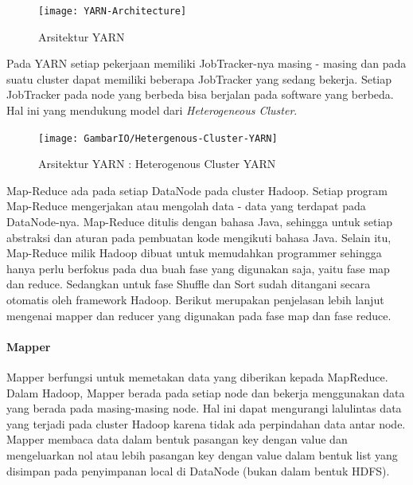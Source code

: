 \begin{figure}[H]
\centering
\texttt{[image: YARN-Architecture]}
\caption[Arsitektur YARN]{Arsitektur YARN}
\label{fig:Arsitektur YARN-1}
\end{figure}
		
Pada YARN setiap pekerjaan memiliki JobTracker-nya masing - masing dan pada suatu cluster dapat memiliki beberapa JobTracker yang sedang bekerja. Setiap JobTracker pada node yang berbeda bisa berjalan pada software yang berbeda. Hal ini yang mendukung model  dari \textit{Heterogeneous Cluster}.


\begin{figure}[h]
	\centering
	\texttt{[image: GambarIO/Hetergenous-Cluster-YARN]}
	\caption[Arsitektur YARN]{Arsitektur YARN : Heterogenous Cluster YARN}
	\label{fig:Arsitektur YARN : Heterogenous Cluster YARN}
\end{figure}

Map-Reduce ada pada setiap DataNode pada cluster Hadoop. Setiap program Map-Reduce mengerjakan atau mengolah data - data yang terdapat pada DataNode-nya. Map-Reduce ditulis dengan bahasa Java, sehingga untuk setiap abstraksi dan aturan pada pembuatan kode mengikuti bahasa Java. Selain itu, Map-Reduce milik Hadoop dibuat untuk memudahkan programmer sehingga hanya perlu berfokus pada dua buah fase yang digunakan saja, yaitu fase map dan reduce. Sedangkan untuk fase Shuffle dan Sort sudah ditangani secara otomatis oleh framework Hadoop. Berikut merupakan penjelasan lebih lanjut mengenai mapper dan reducer yang digunakan pada fase map dan fase reduce.

\paragraph{Mapper} 

Mapper berfungsi untuk memetakan data yang diberikan kepada MapReduce. Dalam Hadoop, Mapper berada pada setiap node dan bekerja menggunakan data yang berada pada masing-masing node. Hal ini dapat mengurangi lalulintas data yang terjadi pada cluster Hadoop karena tidak ada perpindahan data antar node. Mapper membaca data dalam bentuk pasangan key dengan value dan mengeluarkan nol atau lebih pasangan key dengan value dalam bentuk list yang disimpan pada penyimpanan local di DataNode (bukan dalam bentuk HDFS).

